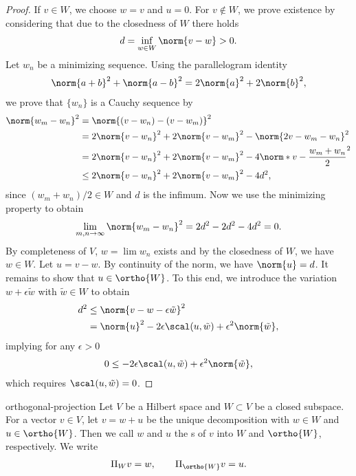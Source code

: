 \begin{proof}
  If $v\in W$, we choose $w=v$ and $u=0$. For $v\not\in W$, we prove
  existence by considering that due to the closedness of $W$ there holds
  \begin{gather}
    d=\inf_{w\in W} \norm{v-w} >0.
  \end{gather}
  Let $w_n$ be a minimizing sequence. Using the parallelogram identity
  \begin{gather}
    \norm{a+b}^2+\norm{a-b}^2 = 2\norm{a}^2+2\norm{b}^2,
  \end{gather}
  we prove that $\{w_n\}$ is a Cauchy sequence by
  \begin{align}
    \norm{w_m-w_n}^2 &= \norm{(v-w_n)-(v-w_m)}^2\\
    &= 2\norm{v-w_n}^2+2\norm{v-w_m}^2-\norm{2v-w_m-w_n}^2\\
    &= 2\norm{v-w_n}^2+2\norm{v-w_m}^2-4\norm*{v-\frac{w_m+w_n}2}^2\\
    &\le 2\norm{v-w_n}^2+2\norm{v-w_m}^2-4d^2,
  \end{align}
  since $(w_m+w_n)/2\in W$ and $d$ is the infimum. Now we use the
  minimizing property to obtain
  \begin{gather}
    \lim_{m,n\to\infty}\norm{w_m-w_n}^2 = 2d^2-2d^2 -4d^2=0.
  \end{gather}
  By completeness of $V$, $w=\lim w_n$ exists and by the closedness of
  $W$, we have $w\in W$. Let $u=v-w$. By continuity of the norm, we
  have $\norm{u}=d$. It remains to show that $u\in \ortho{W}$. To this
  end, we introduce the variation $w+\epsilon \tilde w$ with $\tilde
  w\in W$ to obtain
  \begin{align}
    d^2 &\le \norm{v-w-\epsilon \tilde w}^2\\
    &= \norm{u}^2-2\epsilon\scal(u,\tilde w)+\epsilon^2 \norm{\tilde w},
  \end{align}
  implying for any $\epsilon>0$
  \begin{gather}
    0\le-2\epsilon\scal(u,\tilde w)+\epsilon^2 \norm{\tilde w},
  \end{gather}
  which requires $\scal(u,\tilde w) = 0$.
\end{proof}

\begin{Definition}{orthogonal-projection}
  Let $V$ be a Hilbert space and $W\subset V$ be a closed
  subspace. For a vector $v\in V$, let $v=w+u$ be the unique
  decomposition with $w\in W$ and $u\in \ortho{W}$. Then we call $w$ and
  $u$ the s of $v$ into $W$ and $\ortho{W}$,
  respectively. We write
  \begin{gather}
    \Pi_W v = w, \qquad \Pi_{\ortho{W}} v = u.
  \end{gather}
\end{Definition}

